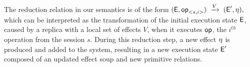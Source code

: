 The reduction relation in our semantics is of the form
{\footnotesize $
({\normalfont \textsf{E}},{\normalfont \textsf{op}}_{<s,i>}) \;\xrightarrow{V}\; ({\normalfont \textsf{E}}', \eta),
$}
which can be interpreted as the transformation of the initial execution state
${\normalfont \textsf{E}}$, caused by a replica with a local 
set of effects $V$, when it executes
${\normalfont \textsf{op}}$, the $i^{th}$ operation from the session $s$. 
During this reduction step, a new effect $\eta$ is produced and added to
the system, resulting in a new execution state ${\normalfont \textsf{E}}'$ composed of an updated effect
soup and new primitive relations.





